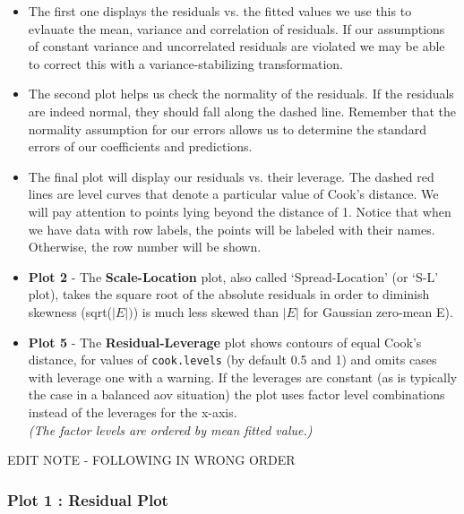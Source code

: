 \documentclass[residuals.tex]{subfiles}
\begin{document}
	\bigskip
	\begin{itemize}
		\item The first one displays the residuals vs. the fitted values
		we use this to evlauate the mean, variance and correlation of residuals.
		If our assumptions of constant variance and uncorrelated residuals are
		violated we may be able to correct this with a variance-stabilizing
		transformation.
		
		\item The second plot helps us check the normality of the residuals. If the
		residuals are indeed normal, they should fall along the dashed line.
		Remember that the normality assumption for our errors allows us to determine
		the standard errors of our coefficients and predictions.
		
		\item The final plot will display our residuals vs. their leverage. The dashed red
		lines are level curves that denote a particular value of Cook's distance.
		We will pay attention to points lying beyond the distance of 1. Notice that
		when we have data with row labels, the points will be labeled with their
		names. Otherwise, the row number will be shown.
	\end{itemize}
	\bigskip
	\begin{itemize}
		\item \textbf{Plot 2} -
		The \textbf{Scale-Location} plot, also called ‘Spread-Location’ (or ‘S-L’ plot), takes the square root of the absolute residuals in order to diminish skewness (sqrt($|E|)$) is much less skewed than $| E |$ for Gaussian zero-mean E).
		
		\item \textbf{Plot 5} - 
		The \textbf{Residual-Leverage} plot shows contours of equal Cook's distance, for values of \texttt{cook.levels} (by default 0.5 and 1) and omits cases with leverage one with a warning. If the leverages are constant (as is typically the case in a balanced aov situation) the plot uses factor level combinations instead of the leverages for the x-axis. \\
		\textit{(The factor levels are ordered by mean fitted value.)}
	\end{itemize}
	\bigskip
	EDIT NOTE - FOLLOWING IN WRONG ORDER
	
	\subsubsection*{Plot 1 : Residual Plot}
	
\end{document}
